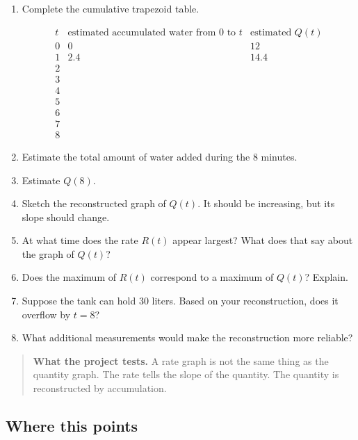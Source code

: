 \begin{enumerate}
\item Complete the cumulative trapezoid table.

\[
\begin{array}{c|c|c}
t & \text{estimated accumulated water from }0\text{ to }t & \text{estimated }Q(t) \\ \hline
0 & 0 & 12 \\
1 & 2.4 & 14.4 \\
2 & & \\
3 & & \\
4 & & \\
5 & & \\
6 & & \\
7 & & \\
8 & &
\end{array}
\]

\item Estimate the total amount of water added during the \(8\) minutes.

\item Estimate \(Q(8)\).

\item Sketch the reconstructed graph of \(Q(t)\).  It should be increasing, but its slope
should change.

\item At what time does the rate \(R(t)\) appear largest?  What does that say about the
graph of \(Q(t)\)?

\item Does the maximum of \(R(t)\) correspond to a maximum of \(Q(t)\)?  Explain.

\item Suppose the tank can hold \(30\) liters.  Based on your reconstruction, does it
overflow by \(t=8\)?

\item What additional measurements would make the reconstruction more reliable?

\end{enumerate}

\begin{quote}
\textbf{What the project tests.}
A rate graph is not the same thing as the quantity graph.  The rate tells the slope of
the quantity.  The quantity is reconstructed by accumulation.
\end{quote}

\subsection{Where this points}
\label{subsec:chapter9-hook-applications}

